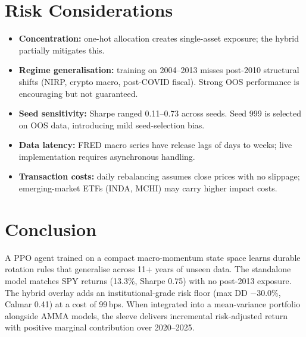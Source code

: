 \documentclass[11pt, a4paper]{article}
\begin{document}
\section{Risk Considerations}

\begin{itemize}[leftmargin=*, itemsep=0.3em]
  \item \textbf{Concentration:} one-hot allocation creates single-asset exposure; the hybrid partially mitigates this.
  \item \textbf{Regime generalisation:} training on 2004--2013 misses post-2010 structural shifts (NIRP, crypto macro, post-COVID fiscal). Strong OOS performance is encouraging but not guaranteed.
  \item \textbf{Seed sensitivity:} Sharpe ranged 0.11--0.73 across seeds. Seed 999 is selected on OOS data, introducing mild seed-selection bias.
  \item \textbf{Data latency:} FRED macro series have release lags of days to weeks; live implementation requires asynchronous handling.
  \item \textbf{Transaction costs:} daily rebalancing assumes close prices with no slippage; emerging-market ETFs (INDA, MCHI) may carry higher impact costs.
\end{itemize}

\section{Conclusion}

A PPO agent trained on a compact macro-momentum state space learns durable rotation rules that generalise across 11+ years of unseen data. The standalone model matches SPY returns (13.3\%, Sharpe 0.75) with no post-2013 exposure. The hybrid overlay adds an institutional-grade risk floor (max DD $-$30.0\%, Calmar 0.41) at a cost of 99\,bps. When integrated into a mean-variance portfolio alongside AMMA models, the sleeve delivers incremental risk-adjusted return with positive marginal contribution over 2020--2025.

\end{document}

